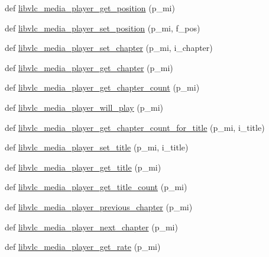 \begin{DoxyCompactItemize}
\item 
def \hyperlink{namespacesrc_1_1lib_1_1vlc_a971c7033ff06ffb393c64ff309a7ec71}{libvlc\+\_\+media\+\_\+player\+\_\+get\+\_\+position} (p\+\_\+mi)
\item 
def \hyperlink{namespacesrc_1_1lib_1_1vlc_a5892410f0094840003c1d67e47c8e6e5}{libvlc\+\_\+media\+\_\+player\+\_\+set\+\_\+position} (p\+\_\+mi, f\+\_\+pos)
\item 
def \hyperlink{namespacesrc_1_1lib_1_1vlc_a6b182ceb3f47c84552a821b62eb319f3}{libvlc\+\_\+media\+\_\+player\+\_\+set\+\_\+chapter} (p\+\_\+mi, i\+\_\+chapter)
\item 
def \hyperlink{namespacesrc_1_1lib_1_1vlc_a5cae846b1bfba9139727e0a40b16afb5}{libvlc\+\_\+media\+\_\+player\+\_\+get\+\_\+chapter} (p\+\_\+mi)
\item 
def \hyperlink{namespacesrc_1_1lib_1_1vlc_a96ecf9f7a242d6bea6229869521bae65}{libvlc\+\_\+media\+\_\+player\+\_\+get\+\_\+chapter\+\_\+count} (p\+\_\+mi)
\item 
def \hyperlink{namespacesrc_1_1lib_1_1vlc_af3d9bb2d3b8978ff4bdc32e2d55f2db8}{libvlc\+\_\+media\+\_\+player\+\_\+will\+\_\+play} (p\+\_\+mi)
\item 
def \hyperlink{namespacesrc_1_1lib_1_1vlc_a8058dd459529feedfa3f630395020d44}{libvlc\+\_\+media\+\_\+player\+\_\+get\+\_\+chapter\+\_\+count\+\_\+for\+\_\+title} (p\+\_\+mi, i\+\_\+title)
\item 
def \hyperlink{namespacesrc_1_1lib_1_1vlc_a7a1be56b2477cba83dc4e5a1eacaa930}{libvlc\+\_\+media\+\_\+player\+\_\+set\+\_\+title} (p\+\_\+mi, i\+\_\+title)
\item 
def \hyperlink{namespacesrc_1_1lib_1_1vlc_a95de16514309789ef1076aa97d0063ee}{libvlc\+\_\+media\+\_\+player\+\_\+get\+\_\+title} (p\+\_\+mi)
\item 
def \hyperlink{namespacesrc_1_1lib_1_1vlc_a6e09e639cba42b3eb68f29157a32baa4}{libvlc\+\_\+media\+\_\+player\+\_\+get\+\_\+title\+\_\+count} (p\+\_\+mi)
\item 
def \hyperlink{namespacesrc_1_1lib_1_1vlc_ae25cb51650620a14a5aec092714cd2bf}{libvlc\+\_\+media\+\_\+player\+\_\+previous\+\_\+chapter} (p\+\_\+mi)
\item 
def \hyperlink{namespacesrc_1_1lib_1_1vlc_ab55bf32af1f2a96e5d09bfb79451ba80}{libvlc\+\_\+media\+\_\+player\+\_\+next\+\_\+chapter} (p\+\_\+mi)
\item 
def \hyperlink{namespacesrc_1_1lib_1_1vlc_a94870e64b7c9714f46e1aeed24d08268}{libvlc\+\_\+media\+\_\+player\+\_\+get\+\_\+rate} (p\+\_\+mi)
\item 

\end{DoxyCompactItemize}
